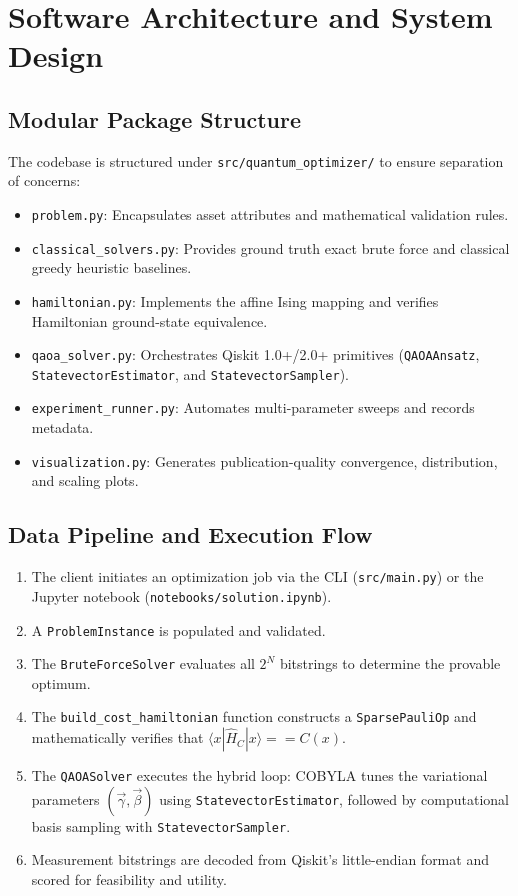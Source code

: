 \section{Software Architecture and System Design}

\subsection{Modular Package Structure}
The codebase is structured under \texttt{src/quantum\_optimizer/} to ensure separation of concerns:
\begin{itemize}
    \item \texttt{problem.py}: Encapsulates asset attributes and mathematical validation rules.
    \item \texttt{classical\_solvers.py}: Provides ground truth exact brute force and classical greedy heuristic baselines.
    \item \texttt{hamiltonian.py}: Implements the affine Ising mapping and verifies Hamiltonian ground-state equivalence.
    \item \texttt{qaoa\_solver.py}: Orchestrates Qiskit 1.0+/2.0+ primitives (\texttt{QAOAAnsatz}, \texttt{StatevectorEstimator}, and \texttt{StatevectorSampler}).
    \item \texttt{experiment\_runner.py}: Automates multi-parameter sweeps and records metadata.
    \item \texttt{visualization.py}: Generates publication-quality convergence, distribution, and scaling plots.
\end{itemize}

\subsection{Data Pipeline and Execution Flow}
\begin{enumerate}
    \item The client initiates an optimization job via the CLI (\texttt{src/main.py}) or the Jupyter notebook (\texttt{notebooks/solution.ipynb}).
    \item A \texttt{ProblemInstance} is populated and validated.
    \item The \texttt{BruteForceSolver} evaluates all $2^N$ bitstrings to determine the provable optimum.
    \item The \texttt{build\_cost\_hamiltonian} function constructs a \texttt{SparsePauliOp} and mathematically verifies that $\langle x | \hat{H}_C | x \rangle == C(x)$.
    \item The \texttt{QAOASolver} executes the hybrid loop: COBYLA tunes the variational parameters $(\vec{\gamma}, \vec{\beta})$ using \texttt{StatevectorEstimator}, followed by computational basis sampling with \texttt{StatevectorSampler}.
    \item Measurement bitstrings are decoded from Qiskit's little-endian format and scored for feasibility and utility.
\end{enumerate}
